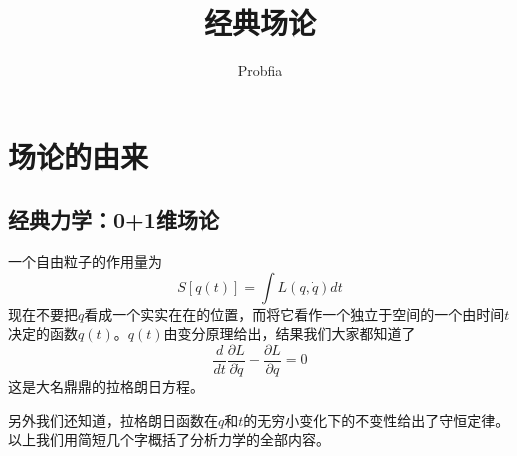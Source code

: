 \documentclass[a4paper,11pt]{ctexart}
\title{经典场论}
\author{Probfia}
\date{}
\newcommand{\beq}{\begin{equation}}
\newcommand{\eeq}{\end{equation}}
\begin{document}
\maketitle
\tableofcontents
\section{场论的由来}
\subsection{经典力学：0+1维场论}
一个自由粒子的作用量为
\beq
S[q(t)] = \int L(q,\dot{q}) dt
\eeq
现在不要把$q$看成一个实实在在的位置，而将它看作一个独立于空间的一个由时间$t$决定的函数$q(t)$。$q(t)$由变分原理给出，结果我们大家都知道了
\beq
\frac{d}{dt} \frac{\partial L}{\partial \dot{q}} - \frac{\partial L}{\partial q} = 0
\eeq
这是大名鼎鼎的拉格朗日方程。
\par
另外我们还知道，拉格朗日函数在$q$和$t$的无穷小变化下的不变性给出了守恒定律。以上我们用简短几个字概括了分析力学的全部内容。
\end{document}
